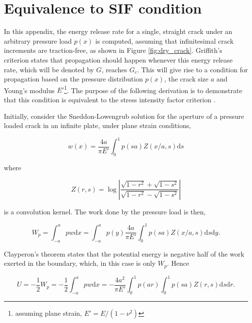 \clearpage
\appendix
\chapter{Equivalence to SIF condition}\label{SIF_equivalence}

In this appendix, the energy release rate for a single, straight crack under an arbitrary pressure load $p(x)$ is computed, assuming that infinitesimal crack increments are traction-free, as shown in Figure \ref{fig:dry_crack}. Griffith's criterion states that propagation should happen whenever this energy release rate, which will be denoted by $G$, reaches $G_c$. This will give rise to a condition for propagation based on the pressure distribution $p(x)$, the crack size $a$ and Young's modulus $E'$\footnote{assuming plane strain, $E'=E/(1-\nu^2)$}. The purpose of the following derivation is to demonstrate that this condition is equivalent to the stress intensity factor criterion \cite{irwin1957analysis}.

Initially, consider the Sneddon-Lowengrub solution for the aperture of a pressure loaded crack in an infinite plate, under plane strain conditions,

\begin{equation}
    w(x) = \dfrac{4a}{\pi E'}\int^1_0p(sa)Z(x/a, s)\text{d}s
\end{equation}

\noindent where

\begin{equation}
    Z(r,s) = \log\left|\dfrac{\sqrt{1-r^2}+\sqrt{1-s^2}}{\sqrt{1-r^2}-\sqrt{1-s^2}}\right|
\end{equation}

\noindent is a convolution kernel. The work done by the pressure load is then,

\begin{equation}
    W_p = \int_{-a}^a p w \text{d}x = \int_{-a}^a p(y) \dfrac{4a}{\pi E'}\int^1_0p(sa)Z(x/a, s)\text{d}s\text{d}y.
\end{equation}

\noindent Clayperon's theorem \cite{fosdick2003} states that the potential energy is negative half of the work exerted in the boundary, which, in this case is only $W_p$. Hence

\begin{equation}
    U = -\dfrac{1}{2}W_p = -\dfrac{1}{2}\int_{-a}^a p w \text{d}x = -\dfrac{4a^2}{\pi E'}\int_{0}^1 p(ar)\int^1_0p(sa)Z(r, s)\text{d}s\text{d}r.
\end{equation}

